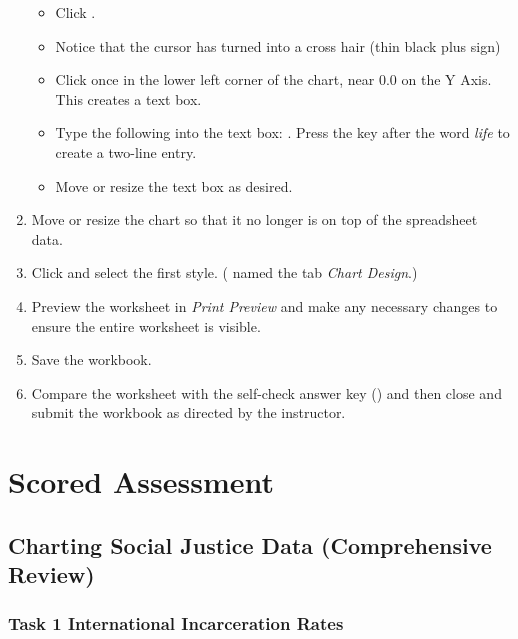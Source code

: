 \begin{enumerate}[resume]
	\begin{itemize}
		\item Click .
		\item Notice that the cursor has turned into a cross hair (thin black plus sign)
		\item Click once in the lower left corner of the chart, near $ 0.0 $ on the Y Axis. This creates a text box.
		\item Type the following into the text box: . Press the  key after the word \textit{life} to create a two-line entry. 
		\item Move or resize the text box as desired.
	\end{itemize}
	
	\item Move or resize the chart so that it no longer is on top of the spreadsheet data.
	\item Click  and select the first style. ( named the tab \textit{Chart Design}.)
	\item Preview the  worksheet in \textit{Print Preview} and make any necessary changes to ensure the entire worksheet is visible.
	\item Save the  workbook.
	\item Compare the worksheet with the self-check answer key () and then close and submit the  workbook as directed by the instructor.
	
\end{enumerate}

\section{Scored Assessment}

\subsection{Charting Social Justice Data (Comprehensive Review)}

\subsubsection{Task 1 International Incarceration Rates}

